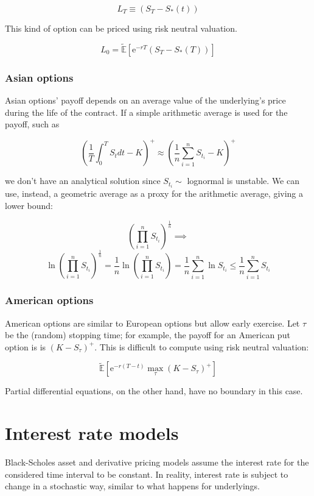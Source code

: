 \documentclass[oneside,titlepage,headinclude,12pt,a4paper,BCOR5mm,footinclude]{book}
\theoremstyle{defn}
\newcommand{\eexp}{\mathrm{e}}
\newcommand{\rnE}[1]{\mathbb{\tilde E}\left[ {#1} \right]}
\begin{document}
\[
  L_T\equiv (S_T - S_*(t))
\]

This kind of option can be priced using risk neutral valuation.

\[
  L_0 = \rnE{\eexp^{-rT}(S_T-S_*(T))}
\]

\subsection{Asian options}

Asian options'  payoff depends  on an  average value  of the  underlying's price
during the life of the contract. If  a simple arithmetic average is used for the
payoff, such as

\[
  \left(\frac{1}{T} \int_0^T S_tdt - K\right)^+ \approx 
  \left(\frac{1}{n}\sum_{i=1}^{n} S_{t_i} -K\right)^+
\]

we don't have an analytical solution since $S_{t_i} \sim $ lognormal is unstable.
We can use, instead, a geometric average as a proxy for the arithmetic average,
giving a lower bound:

\[
  \left(\prod_{i=1}^n S_{t_i}\right)^{\frac{1}{n}} \implies
\]
\[
  \ln\left(\prod_{i=1}^n S_{t_i}\right)^{\frac{1}{n}} =
  \frac{1}{n}\ln\left(\prod_{i=1}^n S_{t_i}\right) =\frac{1}{n}\sum_{i=1}^{n} \ln S_{t_i}
  \leq \frac{1}{n}\sum_{i=1}^{n} S_{t_i} 
\]

\subsection{American options}

American options are  similar to European options but allow  early exercise. Let
$\tau$ be  the (random) stopping time;  for example, the payoff  for an American
put option  is is  $(K -  S_\tau)^+$. This  is difficult  to compute  using risk
neutral valuation:

\[
  \rnE{\eexp^{-r(T-t)} \max_\tau (K-S_\tau)^+}
\]

Partial differential equations, on the other hand, have no boundary in this case.

\chapter{Interest rate models}

Black-Scholes asset and  derivative pricing models assume the  interest rate for
the  considered time  interval  to be  constant. In  reality,  interest rate  is
subject to change in a stochastic way, similar to what happens for underlyings.
\end{document}
